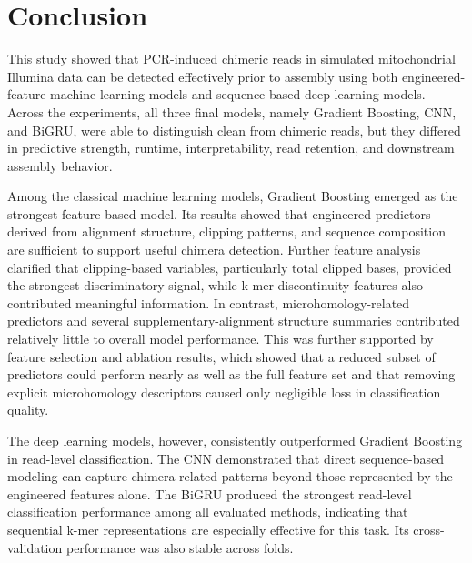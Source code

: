 \chapter{Conclusion}

This study showed that PCR-induced chimeric reads in simulated mitochondrial Illumina data can be detected effectively prior to assembly using both engineered-feature machine learning models and sequence-based deep learning models. Across the experiments, all three final models, namely Gradient Boosting, CNN, and BiGRU, were able to distinguish clean from chimeric reads, but they differed in predictive strength, runtime, interpretability, read retention, and downstream assembly behavior.

Among the classical machine learning models, Gradient Boosting emerged as the strongest feature-based model. Its results showed that engineered predictors derived from alignment structure, clipping patterns, and sequence composition are sufficient to support useful chimera detection. Further feature analysis clarified that clipping-based variables, particularly total clipped bases, provided the strongest discriminatory signal, while k-mer discontinuity features also contributed meaningful information. In contrast, microhomology-related predictors and several supplementary-alignment structure summaries contributed relatively little to overall model performance. This was further supported by feature selection and ablation results, which showed that a reduced subset of predictors could perform nearly as well as the full feature set and that removing explicit microhomology descriptors caused only negligible loss in classification quality.

The deep learning models, however, consistently outperformed Gradient Boosting in read-level classification. The CNN demonstrated that direct sequence-based modeling can capture chimera-related patterns beyond those represented by the engineered features alone. The BiGRU produced the strongest read-level classification performance among all evaluated methods, indicating that sequential k-mer representations are especially effective for this task. Its cross-validation performance was also stable across folds.


